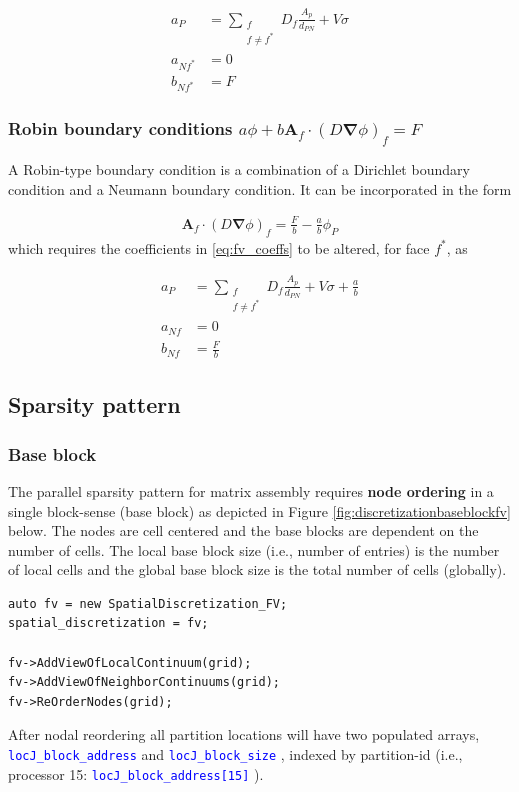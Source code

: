 \documentclass[11pt,letterpaper,titlepage]{article}
\newcommand{\xmltag}[1]{\textcolor{blue}{ \texttt{#1}} }
\newcommand{\beq}{\begin{equation*}
\begin{aligned}}
\newcommand{\eeq}{\end{aligned}
\end{equation*}}
\numberwithin{equation}{section}
\begin{document}
\beq 
a_P &= \sum_{\substack{f \\ f\ne f^*}} D_f \frac{A_p}{d_{PN}} + V\sigma\\
a_{Nf^*} &= 0 \\
b_{Nf^*} &= F
\eeq 

\vspace{0.5cm}
\subsubsection{Robin boundary conditions $a\phi + b\mathbf{A}_f \cdot (D\boldsymbol{\nabla} \phi)_f = F$}
A Robin-type boundary condition is a combination of a Dirichlet boundary condition and a Neumann boundary condition. It can be incorporated in the form

\beq 
\mathbf{A}_f \cdot (D\boldsymbol{\nabla} \phi)_f = \frac{F}{b} - \frac{a}{b} \phi_P
\eeq 
\newline 
which requires the coefficients in \eqref{eq:fv_coeffs} to be altered, for face $f^*$, as

\beq 
a_P &= \sum_{\substack{f \\ f\ne f^*}} D_f \frac{A_p}{d_{PN}} + V\sigma + \frac{a}{b}\\
a_{Nf} &= 0 \\
b_{Nf} &= \frac{F}{b}
\eeq 

\newpage
\subsection{Sparsity pattern}
\subsubsection{Base block}
The parallel sparsity pattern for matrix assembly requires \textbf{node ordering} in a single block-sense (base block) as depicted in Figure \ref{fig:discretizationbaseblockfv} below. The nodes are cell centered and the base blocks are dependent on the number of cells. The local base block size (i.e., number of entries) is the number of local cells and the global base block size is the total number of cells (globally). 
\vspace{0.5cm}
\begin{lstlisting}
auto fv = new SpatialDiscretization_FV;
spatial_discretization = fv;

fv->AddViewOfLocalContinuum(grid);
fv->AddViewOfNeighborContinuums(grid);
fv->ReOrderNodes(grid);
\end{lstlisting}
\vspace{0.5cm}
After nodal reordering all partition locations will have two populated arrays, \xmltag{locJ\_block\_address} and \xmltag{locJ\_block\_size}, indexed by partition-id (i.e., processor 15: \xmltag{locJ\_block\_address[15]} ). 
\end{document}
